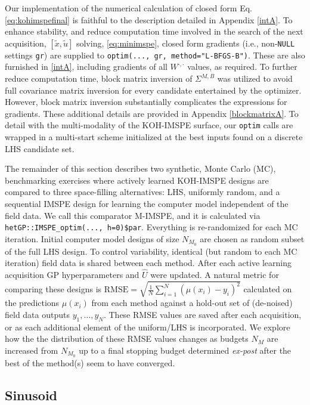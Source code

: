 \documentclass[
]{article}
\begin{document}
Our implementation of the numerical calculation of closed form Eq. \eqref{eq:kohimspefinal} is faithful to the description detailed in Appendix \ref{intA}.
To enhance stability, and reduce computation time involved in the search
of the next acquisition, \([\tilde{x}, \tilde{u}]\) solving,
\eqref{eq:minimspe}, closed form gradients (i.e., non-\texttt{NULL} settings \texttt{gr}) are
supplied to \texttt{optim(...,\ gr,\ method="L-BFGS-B")}. These are also furnished
in \ref{intA}, including gradients of all \(W^{\cdot, \cdot}\) values,
as required. To further reduce computation time, block matrix
inversion \citep{bernstein2009matrix} of \(\Sigma^{M,B}\) was utilized to
avoid full covariance matrix inversion for every candidate entertained
by the optimizer. However, block matrix inversion substantially complicates the expressions for gradients. These
additional details are provided in
Appendix \ref{blockmatrixA}. To detail with the multi-modality of the KOH-IMSPE surface, our \texttt{optim} calls are wrapped in a multi-start scheme initialized at the best inputs found on a discrete LHS
candidate set.

The remainder of this section describes two synthetic, Monte Carlo (MC), benchmarking exercises where actively learned KOH-IMSPE designs are compared to three space-filling alternatives: LHS, uniformly random, and a sequential IMSPE design for learning the computer model independent of the field data. We call
this comparator M-IMSPE, and it is calculated via \texttt{hetGP::IMSPE\_optim(...,\ h=0)\$par}. Everything is re-randomized for each MC iteration. Initial computer model designs of size \(N_{M_0}\) are chosen as random subset of the full LHS design. To control variability, identical (but random to each MC iteration) field data is shared between each method. After each active learning acquisition GP hyperparameters and \(\hat{U}\) were updated. A natural
metric for comparing these designs is \(\mathrm{RMSE} = \sqrt{\frac{1}{N}\sum^{N}_{i = 1} (\mu(x_i) - y_i)^2}\)
calculated on the predictions \(\mu(x_i)\) from each method against a hold-out
set of (de-noised) field data outputs \(y_1, \dots, y_N\). These RMSE
values are saved after each acquisition, or as each additional element of the
uniform/LHS is incorporated. We explore how the the distribution of these
RMSE values changes as budgets \(N_M\) are increased from \(N_{M_0}\) up to
a final stopping budget determined \emph{ex-post} after the best of the method(s)
seem to have converged.

\hypertarget{sinexample}{%
\subsection{Sinusoid}\label{sinexample}}
\end{document}
